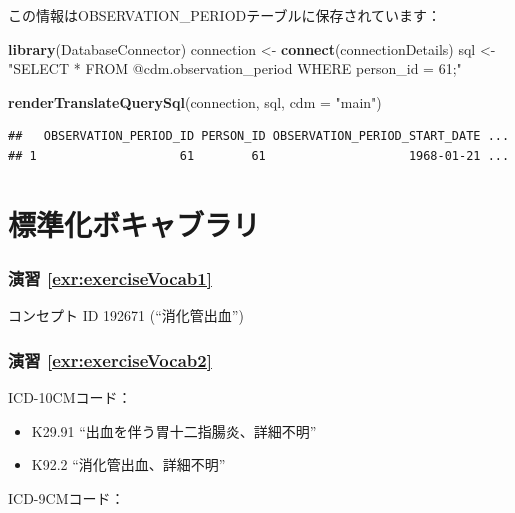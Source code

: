 \documentclass[
  11pt]{book}
\newenvironment{Shaded}{\begin{snugshade}}{\end{snugshade}}
\newcommand{\AttributeTok}[1]{\textcolor[rgb]{0.13,0.29,0.53}{#1}}
\newcommand{\FunctionTok}[1]{\textcolor[rgb]{0.13,0.29,0.53}{\textbf{#1}}}
\newcommand{\NormalTok}[1]{#1}
\newcommand{\OtherTok}[1]{\textcolor[rgb]{0.56,0.35,0.01}{#1}}
\newcommand{\StringTok}[1]{\textcolor[rgb]{0.31,0.60,0.02}{#1}}
\providecommand{\tightlist}{%
  \setlength{\itemsep}{0pt}\setlength{\parskip}{0pt}}
\theoremstyle{definition}
\theoremstyle{definition}
\theoremstyle{definition}
\theoremstyle{definition}
\theoremstyle{remark}
\begin{document}
この情報はOBSERVATION\_PERIODテーブルに保存されています：

\begin{Shaded}
\begin{Highlighting}[]
\FunctionTok{library}\NormalTok{(DatabaseConnector)}
\NormalTok{connection }\OtherTok{\textless{}{-}} \FunctionTok{connect}\NormalTok{(connectionDetails)}
\NormalTok{sql }\OtherTok{\textless{}{-}} \StringTok{"SELECT *}
\StringTok{FROM @cdm.observation\_period}
\StringTok{WHERE person\_id = 61;"}

\FunctionTok{renderTranslateQuerySql}\NormalTok{(connection, sql, }\AttributeTok{cdm =} \StringTok{"main"}\NormalTok{)}
\end{Highlighting}
\end{Shaded}

\begin{verbatim}
##   OBSERVATION_PERIOD_ID PERSON_ID OBSERVATION_PERIOD_START_DATE ...
## 1                    61        61                    1968-01-21 ...
\end{verbatim}

\section{標準化ボキャブラリ}\label{Vocabanswers}

\subsubsection*{演習 \ref{exr:exerciseVocab1}}\label{ux6f14ux7fd2-refexrexercisevocab1}

コンセプト ID 192671 (``消化管出血'')

\subsubsection*{演習 \ref{exr:exerciseVocab2}}\label{ux6f14ux7fd2-refexrexercisevocab2}

ICD-10CMコード：

\begin{itemize}
\tightlist
\item
  K29.91 ``出血を伴う胃十二指腸炎、詳細不明''
\item
  K92.2 ``消化管出血、詳細不明''
\end{itemize}

ICD-9CMコード：
\end{document}
